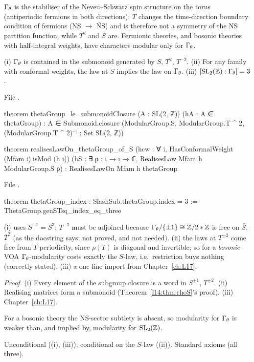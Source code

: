\begin{physics}
$\Gamma_\theta$ is the stabiliser of the Neveu--Schwarz spin structure on the torus (antiperiodic fermions in both directions):
$T$ changes the time-direction boundary condition of fermions (NS $\to$ $\widetilde{\mathrm{NS}}$) and is therefore not a
symmetry of the NS partition function, while $T^2$ and $S$ are. Fermionic theories, and bosonic theories with half-integral
weights, have characters modular only for $\Gamma_\theta$.
\end{physics}

\begin{theorem}\label{l14:thm:thetamonoid}
(i) $\Gamma_\theta$ is contained in the submonoid generated by $S$, $T^2$, $T^{-2}$. (ii) For any family with conformal weights, the
law at $S$ implies the law on $\Gamma_\theta$. (iii) $[\mathrm{SL}_2(\mathbb{Z}):\Gamma_\theta] = 3$.
\end{theorem}
\noindent File .
\begin{leancode}
theorem thetaGroup_le_submonoidClosure (A : SL(2, ℤ)) (hA : A ∈ thetaGroup) :
    A ∈ Submonoid.closure
      ({ModularGroup.S, ModularGroup.T ^ 2, (ModularGroup.T ^ 2)⁻¹} : Set SL(2, ℤ))

theorem realisesLawOn_thetaGroup_of_S (hcw : ∀ i, HasConformalWeight (Mfam i).isMod (h i))
    (hS : ∃ ρ : ι → ι → ℂ, RealisesLaw Mfam h ModularGroup.S ρ) :
    RealisesLawOn Mfam h thetaGroup
\end{leancode}
\noindent File .
\begin{leancode}
theorem thetaGroup_index : SlashSub.thetaGroup.index = 3 :=
  ThetaGroup.genSTsq_index_eq_three
\end{leancode}
\begin{dictionary}
(i) uses $S^{-1} = S^3$; $T^{-2}$ must be adjoined because $\Gamma_\theta/\{\pm1\}\cong{\mathbb{Z}}/2*{\mathbb{Z}}$ is free on $\bar S$, $\bar T^2$ (as the
docstring says; not proved, and not needed). (ii) the laws at $T^{\pm2}$ come free from $T$-periodicity, since $\rho(T)$ is
diagonal and invertible; so for a \emph{bosonic} VOA $\Gamma_\theta$-modularity costs exactly the $S$-law, i.e.\ restriction buys
nothing (correctly stated). (iii) a one-line import from Chapter~\ref{ch:L17}.
\end{dictionary}
\noindent\emph{Proof.} (i) Every element of the subgroup closure is a word in $S^{\pm1}$, $T^{\pm2}$. (ii) Realising matrices
form a submonoid (Theorem~\ref{l14:thm:rhoS}'s proof). (iii) Chapter~\ref{ch:L17}.
\begin{physics}
For a bosonic theory the NS-sector subtlety is absent, so modularity for $\Gamma_\theta$ is weaker than, and implied by, modularity
for $\mathrm{SL}_2(\mathbb{Z})$.
\end{physics}
\begin{status}
Unconditional ((i), (iii)); conditional on the $S$-law ((ii)). Standard axioms (all three).
\end{status}

